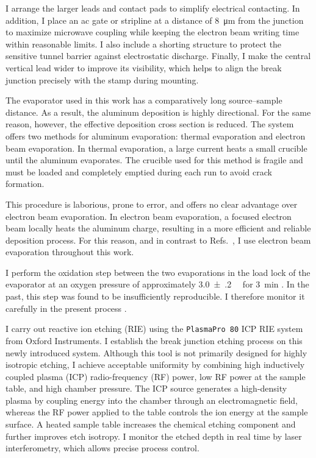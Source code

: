         I arrange the larger leads and contact pads to simplify electrical contacting. In addition, I place an ac gate or stripline at a distance of \qty{8}{\micro\meter} from the junction to maximize microwave coupling while keeping the electron beam writing time within reasonable limits. I also include a shorting structure to protect the sensitive tunnel barrier against electrostatic discharge. Finally, I make the central vertical lead wider to improve its visibility, which helps to align the break junction precisely with the stamp during mounting.

        The evaporator used in this work has a comparatively long source--sample distance. As a result, the aluminum deposition is highly directional. For the same reason, however, the effective deposition cross section is reduced. The system offers two methods for aluminum evaporation: thermal evaporation and electron beam evaporation. In thermal evaporation, a large current heats a small crucible until the aluminum evaporates. The crucible used for this method is fragile and must be loaded and completely emptied during each run to avoid crack formation.
        
        This procedure is laborious, prone to error, and offers no clear advantage over electron beam evaporation. In electron beam evaporation, a focused electron beam locally heats the aluminum charge, resulting in a more efficient and reliable deposition process. For this reason, and in contrast to Refs.~\cite{lorenz_wechselspiel_2018,sprenger_interplay_2019,sobral_rey_interplay_2022}, I use electron beam evaporation throughout this work.

        I perform the oxidation step between the two evaporations in the load lock of the evaporator at an oxygen pressure of approximately \qty{3.0(2)}{\milli\barunit} for \qty{3}{\minute} \cite{sobral_rey_interplay_2022}. In the past, this step was found to be insufficiently reproducible. I therefore monitor it carefully in the present process \cite{sprenger_interplay_2019,conzelmann_optimierung_2016}.

        I carry out reactive ion etching (RIE) using the \texttt{PlasmaPro 80} ICP RIE system from Oxford Instruments. I establish the break junction etching process on this newly introduced system. Although this tool is not primarily designed for highly isotropic etching, I achieve acceptable uniformity by combining high inductively coupled plasma (ICP) radio-frequency (RF) power, low RF power at the sample table, and high chamber pressure. The ICP source generates a high-density plasma by coupling energy into the chamber through an electromagnetic field, whereas the RF power applied to the table controls the ion energy at the sample surface. A heated sample table increases the chemical etching component and further improves etch isotropy. I monitor the etched depth in real time by laser interferometry, which allows precise process control.


